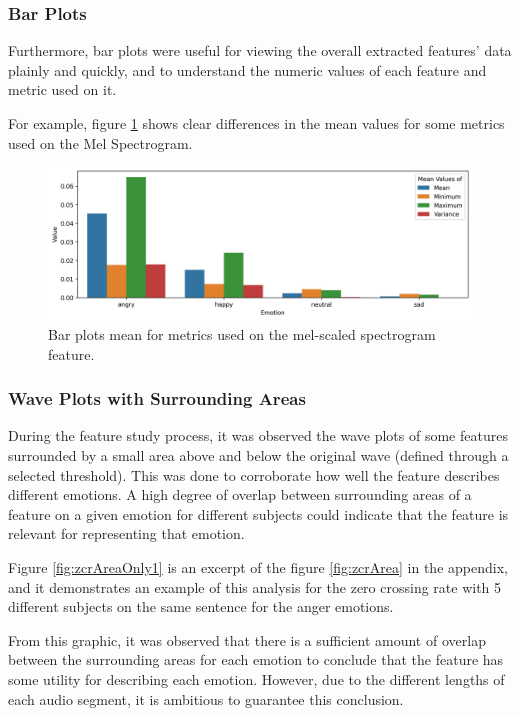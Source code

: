 \subsubsection{Bar Plots}

Furthermore, bar plots were useful for viewing the overall extracted features' data plainly and quickly, and to understand the numeric values of each feature and metric used on it.

For example, figure \ref{fig:melBarPlot} shows clear differences in the mean values for some metrics used on the Mel Spectrogram.

\begin{figure}[H]
	\centering
	\includegraphics[width=\textwidth]{figs/4_1_traditional/meanFeatBarPlot.png}
	\caption{Bar plots mean for metrics used on the mel-scaled spectrogram feature.}
	\label{fig:melBarPlot}
\end{figure}


\subsubsection{Wave Plots with Surrounding Areas}

During the feature study process, it was observed the wave plots of some features surrounded by a small area above and below the original wave (defined through a selected threshold). This was done to corroborate how well the feature describes different emotions. A high degree of overlap between surrounding areas of a feature on a given emotion for different subjects could indicate that the feature is relevant for representing that emotion.

Figure \ref{fig:zcrAreaOnly1} is an excerpt of the figure \ref{fig:zcrArea} in the appendix, and it demonstrates an example of this analysis for the zero crossing rate with 5 different subjects on the same sentence for the anger emotions.

From this graphic, it was observed that there is a sufficient amount of overlap between the surrounding areas for each emotion to conclude that the feature has some utility for describing each emotion. However, due to the different lengths of each audio segment, it is ambitious to guarantee this conclusion.

